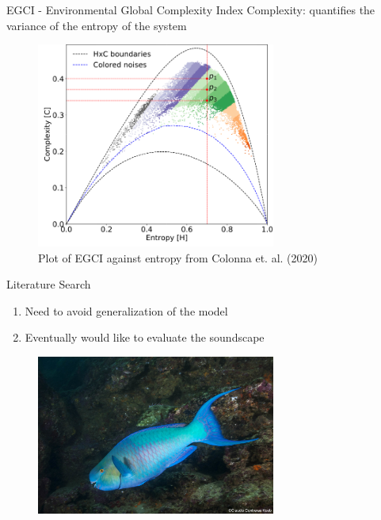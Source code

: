\begin{frame}{EGCI - Environmental Global Complexity Index}
    Complexity: quantifies the variance of the entropy of the system
    \begin{figure}
        \centering
        \includegraphics[height=0.7\textheight,width=0.7\textwidth,keepaspectratio]{images/aid_3.png}
        \caption{Plot of EGCI against entropy from Colonna et. al. (2020)}
    \end{figure}
\end{frame}

\begin{frame}{Literature Search}
    \begin{enumerate}
        \item Need to avoid generalization of the model
        \item Eventually would like to evaluate the soundscape
    \end{enumerate}
    \begin{figure}
        \centering
        \includegraphics[height=0.7\textheight,width=0.7\textwidth,keepaspectratio]{images/aid_4.jpg}
    \end{figure}
\end{frame}

